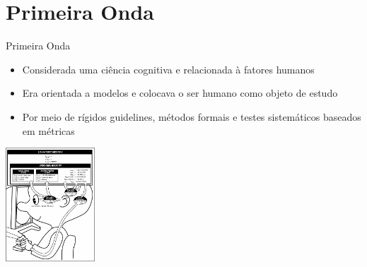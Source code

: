\section{Primeira Onda}

\begin{frame}[t, fragile]{Primeira Onda}
    \begin{itemize}
    	\item Considerada uma ciência \alert{cognitiva} e relacionada à \alert{fatores humanos}
    	\item Era orientada a modelos e colocava o ser \alert{humano como objeto de estudo}    	
    	\item Por meio de rígidos \alert{guidelines}, métodos formais e testes sistemáticos baseados em métricas
    \end{itemize}  
    \begin{flushright}
		    \includegraphics[width=0.25\textwidth]{imagens/primeira-onda}
    \end{flushright} 

\end{frame}
